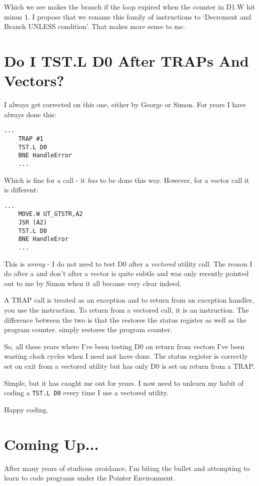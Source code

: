 Which we see makes the branch if the loop expired when the counter in D1.W
        hit minus 1. I propose that we rename this family of instructions to `Decrement
        and Branch UNLESS condition'. That makes more sense to me.

\section{Do I TST.L D0 After TRAPs And Vectors?}
\label{ch19-trap-vector}%

I always get corrected on this one, either by George or Simon. For years I
        have always done this:

\begin{lstlisting}[firstnumber=1,]
    ...
    TRAP #1
    TST.L D0
    BNE HandleError
    ...
\end{lstlisting}

Which is fine for a  call -{} it \emph{has} to be done this
        way. However, for a vector call it is different:

\begin{lstlisting}[firstnumber=1,]
    ...
    MOVE.W UT_GTSTR,A2
    JSR (A2)
    TST.L D0
    BNE HandleEror
    ...
\end{lstlisting}

This is \emph{wrong} -{} I do not need to test D0 after a \emph{vectored} utility call. The
        reason I do after a  and don't after a vector is quite subtle and was only
        recently pointed out to me by Simon when it all became very clear indeed.

A TRAP call is treated as an exception and to return from an exception
        handler, you use the  instruction. To return from a vectored call, it is an 
        instruction. The difference between the two is that the  restores the status
        register as well as the program counter.  simply restores the program
        counter.

So, all these years where I've been testing D0 on return from vectors I've
        been wasting clock cycles when I need not have done. The status register is
        correctly set on exit from a vectored utility but has only D0 is set on return
        from a TRAP.

Simple, but it has caught me out for years. I now need to unlearn my habit
	        of coding a \lstinline{TST.L D0} every time I use a vectored utility.

Happy coding.

\section{Coming Up...}
\label{ch19-the-end}%

After many years of studious avoidance, I'm biting the bullet and attempting
        to learn to code programs under the Pointer Environment.


